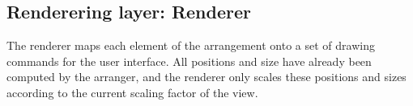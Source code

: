 \begin{tabbing}
%
\end{tabbing}
\rmfamily \normalsize

\subsection{Renderering layer: Renderer} \label{sect:renderer}

The renderer maps each element of the arrangement onto a set of drawing commands for the user interface. All positions and size have already been computed by the arranger, and the renderer only scales these positions and sizes according to the current scaling factor of the view.


